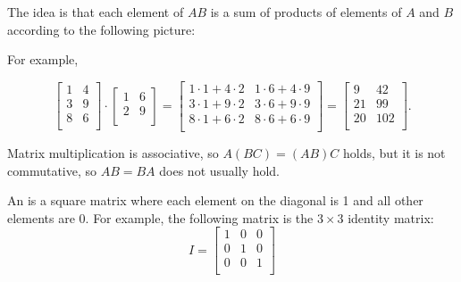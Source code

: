 The idea is that each element of $AB$
is a sum of products of elements of $A$ and $B$
according to the following picture:

\begin{center}
\end{center}

For example,

\[
 \begin{bmatrix}
  1 & 4 \\
  3 & 9 \\
  8 & 6 \\
 \end{bmatrix}
\cdot
 \begin{bmatrix}
  1 & 6 \\
  2 & 9 \\
 \end{bmatrix}
=
 \begin{bmatrix}
  1 \cdot 1 + 4 \cdot 2 & 1 \cdot 6 + 4 \cdot 9 \\
  3 \cdot 1 + 9 \cdot 2 & 3 \cdot 6 + 9 \cdot 9 \\
  8 \cdot 1 + 6 \cdot 2 & 8 \cdot 6 + 6 \cdot 9 \\
 \end{bmatrix}
=
 \begin{bmatrix}
  9 & 42 \\
  21 & 99 \\
  20 & 102 \\
 \end{bmatrix}.
\]

Matrix multiplication is associative,
so $A(BC)=(AB)C$ holds,
but it is not commutative,
so $AB = BA$ does not usually hold.


An  is a square matrix
where each element on the diagonal is 1
and all other elements are 0.
For example, the following matrix
is the $3 \times 3$ identity matrix:
\[
 I = \begin{bmatrix}
  1 & 0 & 0 \\
  0 & 1 & 0 \\
  0 & 0 & 1 \\
 \end{bmatrix}
\]

